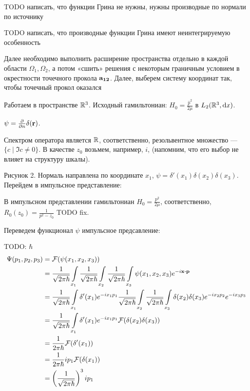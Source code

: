 TODO написать, что функции Грина не нужны, нужны производные по нормали по источнику

TODO написать, что производные функции Грина имеют неинтегрируемую особенность

Далее необходимо выполнить расширение пространства отдельно в каждой области $\Omega_1, \Omega_2$, а потом «сшить» решения с некоторым граничным условием в окрестности точечного прокола $\vb{a_{12}}$. Далее, выберем систему координат так, чтобы точечный прокол оказался 

Работаем в пространстве $\mathbb{R}^3$. Исходный гамильтониан: $H_0 = \frac{\hat{p}^2}{2 \mu}$ в $L_2(\mathbb{R}^3, \dd x)$.


$\psi = \pdv{n} \delta(\vb{r})$.

Спектром оператора является $\mathbb{R}$, соответственно, резольвентное множество — $\{ c \mid \Im c \ne 0 \}$. В качестве $z_0$ возьмем, например, $i$, (напомним, что его выбор не влияет на структуру шкалы).


Рисунок 2. Нормаль направлена по координате $x_1$, $\psi = \delta'(x_1) \delta(x_2) \delta(x_3)$. Перейдем в импульсное представление:

В импульсном представлении гамильтониан $H_0 = \frac{p^2}{2 \mu}$, соответственно, $R_0(z_0) = \frac{1}{p^2 - z_0}$ TODO fix.

Переведем функционал $\psi$ импульсное предсавление:

TODO: $\hbar$
\begin{align*}
\Psi(p_1, p_2, p_3)
&= \mathcal{F}(\psi(x_1, x_2, x_3)) \\
&= \frac{1}{\sqrt{2 \pi \hbar}} \int\limits_{x_1} \frac{1}{\sqrt{2 \pi \hbar}} \int\limits_{x_2} \frac{1}{\sqrt{2 \pi \hbar}} \int\limits_{x_3} \psi(x_1, x_2, x_3) e^{-i \vb{x} \vdot \vb{p}} \\
&= \frac{1}{\sqrt{2 \pi \hbar}} \int\limits_{x_1} \delta'(x_1) e^{-i x_1 p_1} \frac{1}{\sqrt{2 \pi \hbar}} \int\limits_{x_2} \frac{1}{\sqrt{2 \pi \hbar}} \int\limits_{x_3} \delta(x_2) \delta(x_3) e^{-i x_2 p_2} e^{-i x_3 p_3} \\
&= \frac{1}{\sqrt{2 \pi \hbar}} \int\limits_{x_1} \delta'(x_1) e^{-i x_1 p_1} \mathcal{F}(\delta(x_2) \delta(x_3)) \\
&= \frac{1}{2 \pi \hbar} \mathcal{F}(\delta'(x_1)) \\
&= \frac{1}{2 \pi \hbar} i p_1 \mathcal{F}(\delta(x_1)) \\
&= \left(\frac{1}{\sqrt{2 \pi \hbar}}\right)^3 i p_1
\end{align*}

